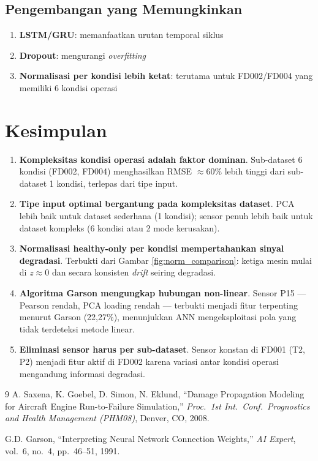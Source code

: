 \documentclass[11pt,a4paper]{article}
\begin{document}
\subsection{Pengembangan yang Memungkinkan}

\begin{enumerate}[noitemsep]
  \item \textbf{LSTM/GRU}: memanfaatkan urutan temporal siklus
  \item \textbf{Dropout}: mengurangi \textit{overfitting}
  \item \textbf{Normalisasi per kondisi lebih ketat}: terutama untuk
    FD002/FD004 yang memiliki 6 kondisi operasi
\end{enumerate}

\section{Kesimpulan}

\begin{enumerate}[noitemsep]
  \item \textbf{Kompleksitas kondisi operasi adalah faktor dominan}.
    Sub-dataset 6 kondisi (FD002, FD004) menghasilkan RMSE $\approx$60\%
    lebih tinggi dari sub-dataset 1 kondisi, terlepas dari tipe input.

  \item \textbf{Tipe input optimal bergantung pada kompleksitas dataset}.
    PCA lebih baik untuk dataset sederhana (1 kondisi); sensor penuh
    lebih baik untuk dataset kompleks (6 kondisi atau 2 mode kerusakan).

  \item \textbf{Normalisasi healthy-only per kondisi mempertahankan
    sinyal degradasi}. Terbukti dari Gambar \ref{fig:norm_comparison}:
    ketiga mesin mulai di $z \approx 0$ dan secara konsisten
    \textit{drift} seiring degradasi.

  \item \textbf{Algoritma Garson mengungkap hubungan non-linear}.
    Sensor P15 --- Pearson rendah, PCA loading rendah ---
    terbukti menjadi fitur terpenting menurut Garson (22,27\%),
    menunjukkan ANN mengeksploitasi pola yang tidak terdeteksi
    metode linear.

  \item \textbf{Eliminasi sensor harus per sub-dataset}.
    Sensor konstan di FD001 (T2, P2) menjadi fitur aktif di FD002
    karena variasi antar kondisi operasi mengandung informasi degradasi.
\end{enumerate}

\begin{thebibliography}{9}
  A. Saxena, K. Goebel, D. Simon, N. Eklund,
  ``Damage Propagation Modeling for Aircraft Engine Run-to-Failure Simulation,''
  \textit{Proc.\ 1st Int.\ Conf.\ Prognostics and Health Management (PHM08)},
  Denver, CO, 2008.

  G.D. Garson,
  ``Interpreting Neural Network Connection Weights,''
  \textit{AI Expert}, vol.~6, no.~4, pp.~46--51, 1991.
\end{thebibliography}
\end{document}
